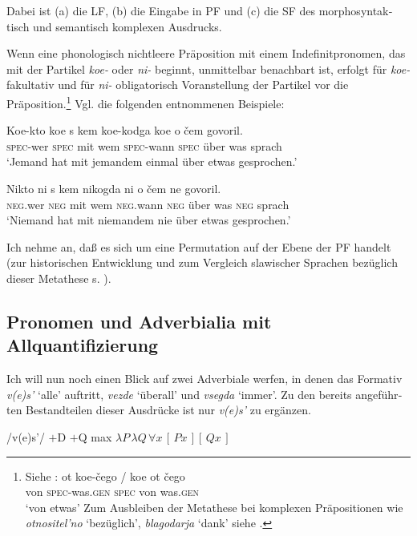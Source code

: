 \documentclass[output=paper, colorlinks, citecolor=brown, booklanguage=german]{langscibook}
\begin{document}
\begin{otherlanguage}{german}
\noindent Dabei ist (a) die LF, (b) die Eingabe in PF und (c) die SF des morphosyntaktisch und semantisch komplexen Ausdrucks.

Wenn eine phonologisch nichtleere Präposition mit einem Indefinitpronomen, das mit der Partikel \textit{koe-} oder \textit{ni-} beginnt, unmittelbar benachbart ist, erfolgt für \textit{koe-} fakultativ und für \textit{ni-} obligatorisch Voranstellung der Partikel vor die Präposition.\footnote{Siehe \citet[66, 76]{Zaliznja1977}: 
\ea
\gll ot koe-čego / koe ot čego\\
    von \textsc{spec}-was.\textsc{gen} {} \textsc{spec} von was.\textsc{gen}\\
\glt ‘von etwas’
\z 
\noindent Zum Ausbleiben der Metathese bei komplexen Präpositionen wie \textit{otnositel'no} `bezüglich', \textit{blagodarja} `dank' siehe \citet{Yadroff.Franks1999}.} Vgl. die folgenden \citet[164]{Isacenko1965} entnommenen Beispiele:

\ea
    \gll Koe-kto koe s kem koe-kodga koe o čem govoril.\\
    \textsc{spec}-wer \textsc{spec} mit wem \textsc{spec}-wann \textsc{spec} über was sprach \\
     \glt ‘Jemand hat mit jemandem einmal über etwas gesprochen.’
\z 

\ea
    \gll Nikto ni s kem nikogda ni o čem ne govoril.\\
    \textsc{neg}.wer \textsc{neg} mit wem \textsc{neg}.wann \textsc{neg} über was \textsc{neg} sprach \\
    \glt ‘Niemand hat mit niemandem nie über etwas gesprochen.’
\z 

\noindent Ich nehme an, daß es sich um eine Permutation auf der Ebene der PF handelt (zur historischen Entwicklung und zum Vergleich slawischer Sprachen bezüglich dieser Metathese s. \citealt{Billings1997}).


\subsection{Pronomen und Adverbialia mit Allquantifizierung}\label{sec:zi02:allquant}

Ich will nun noch einen Blick auf zwei Adverbiale werfen, in denen das Formativ \textit{v(e)s'} `alle' auftritt, \textit{vezde} `überall' und \textit{vsegda} `immer'. Zu den bereits angeführten Bestandteilen dieser Ausdrücke ist nur \textit{v(e)s'} zu ergänzen.

\ea\label{ex:02:56}
    \ea /v(e)s'/
    \ex $+$D $+$Q \textalpha max
    \ex\label{ex:02:56d} $\lambda P\, \lambda Q\, \forall x\, [\, P x \,][\, Q x \,]$
\z\z 


\end{otherlanguage}
\end{document}
